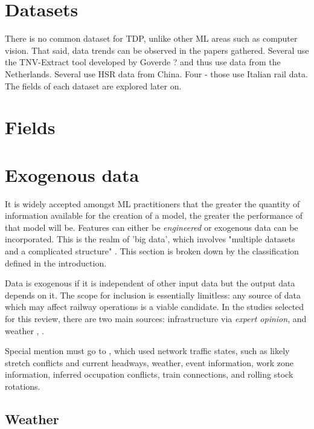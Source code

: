 \documentclass{article}
\begin{document}
\section{Datasets}

There is no common dataset for TDP, unlike other ML areas such as computer vision. That said, data trends can be observed in the papers gathered. Several use the TNV-Extract tool developed by Goverde ? and thus use data from the Netherlands. Several use HSR data from China. Four - those use Italian rail data. The fields of each dataset are explored later on. 

\section{Fields}

\section{Exogenous data}

It is widely accepted amongst ML practitioners that the greater the quantity of information available for the creation of a model, the greater the performance of that model will be. Features can either be \textit{engineered} or exogenous data can be incorporated. This is the realm of 'big data', which involves "multiple datasets and a complicated structure" \cite{Ghofrani_et_al_2018}. This section is broken down by the classification defined in the introduction.

Data is exogenous if it is independent of other input data but the output data depends on it. The scope for inclusion is essentially limitless: any source of data which may affect railway operations is a viable candidate. 
In the studies selected for this review, there are two main sources: infrastructure \cite{markovic_et_al_2015} \cite{milinkovic_et_al_2013} via \textit{expert opinion}, and weather \cite{oneto_et_al_2017} \cite{oneto_et_al_2018}, \cite{oneto_et_al_2019}. 

Special mention must go to \cite{nair_et_al_2019}, which used network traffic states, such as likely stretch conflicts and current headways, weather, event information, work zone information, inferred occupation conflicts, train connections, and rolling stock rotations.

\subsection{Weather}
\end{document}
